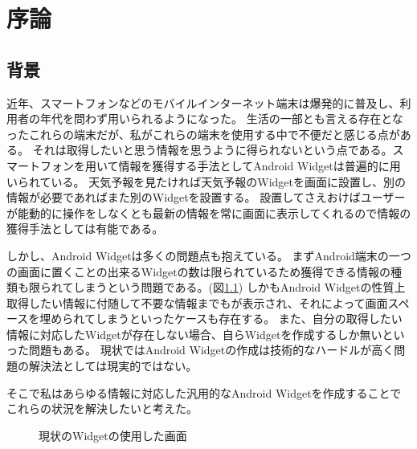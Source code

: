 \chapter{序論}
\label{chap:introduction}
\section{背景}


近年、スマートフォンなどのモバイルインターネット端末は爆発的に普及し、利用者の年代を問わず用いられるようになった。
生活の一部とも言える存在となったこれらの端末だが、私がこれらの端末を使用する中で不便だと感じる点がある。
それは取得したいと思う情報を思うように得られないという点である。スマートフォンを用いて情報を獲得する手法としてAndroid Widgetは普遍的に用いられている。
天気予報を見たければ天気予報のWidgetを画面に設置し、別の情報が必要であればまた別のWidgetを設置する。
設置してさえおけばユーザーが能動的に操作をしなくとも最新の情報を常に画面に表示してくれるので情報の獲得手法としては有能である。

しかし、Android Widgetは多くの問題点も抱えている。
まずAndroid端末の一つの画面に置くことの出来るWidgetの数は限られているため獲得できる情報の種類も限られてしまうという問題である。(図\ref{fig:old_widget})
しかもAndroid Widgetの性質上取得したい情報に付随して不要な情報までもが表示され、それによって画面スペースを埋められてしまうといったケースも存在する。
また、自分の取得したい情報に対応したWidgetが存在しない場合、自らWidgetを作成するしか無いといった問題もある。
現状ではAndroid Widgetの作成は技術的なハードルが高く問題の解決法としては現実的ではない。

そこで私はあらゆる情報に対応した汎用的なAndroid Widgetを作成することでこれらの状況を解決したいと考えた。

\begin{figure}[htbp]
  \begin{minipage}{\hsize}
    \begin{center}
    \end{center}
    \caption{現状のWidgetの使用した画面}
    \label{fig:old_widget}
  \end{minipage}
\end{figure}

